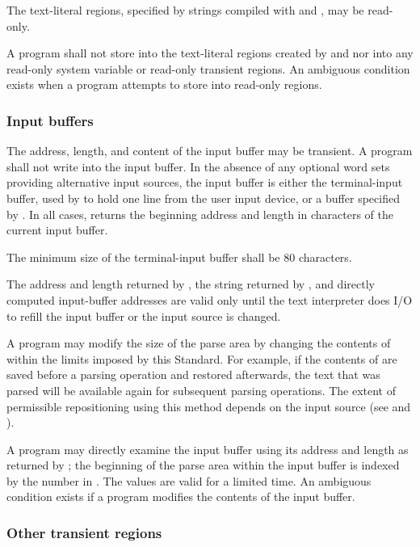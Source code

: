 The text-literal regions, specified by strings compiled with
 and , may be read-only.

A program shall not store into the text-literal regions created
by  and  nor into any read-only system variable
or read-only transient regions. An ambiguous condition exists when
a program attempts to store into read-only regions.

\subsubsection{Input buffers} %
\label{usage:inbuf}

The address, length, and content of the input buffer may be
transient. A program shall not write into the input buffer. In the
absence of any optional word sets providing alternative input
sources, the input buffer is either the terminal-input buffer, used
by  to hold one line from the user input device, or a
buffer specified by . In all cases, 
returns the beginning address and length in characters of the
current input buffer.

The minimum size of the terminal-input buffer shall be 80
characters.

The address and length returned by , the string
returned by , and directly computed input-buffer
addresses are valid only until the text interpreter does I/O to
refill the input buffer or the input source is changed.

A program may modify the size of the parse area by changing the
contents of  within the limits imposed by this Standard.
For example, if the contents of  are saved before a
parsing operation and restored afterwards, the text that was parsed
will be available again for subsequent parsing operations. The
extent of permissible repositioning using this method depends on the
input source (see 
and ).

A program may directly examine the input buffer using its address
and length as returned by ; the beginning of the parse
area within the input buffer is indexed by the number in .
The values are valid for a limited time. An ambiguous condition
exists if a program modifies the contents of the input buffer.

\subsubsection{Other transient regions} %
\label{usage:transient}

